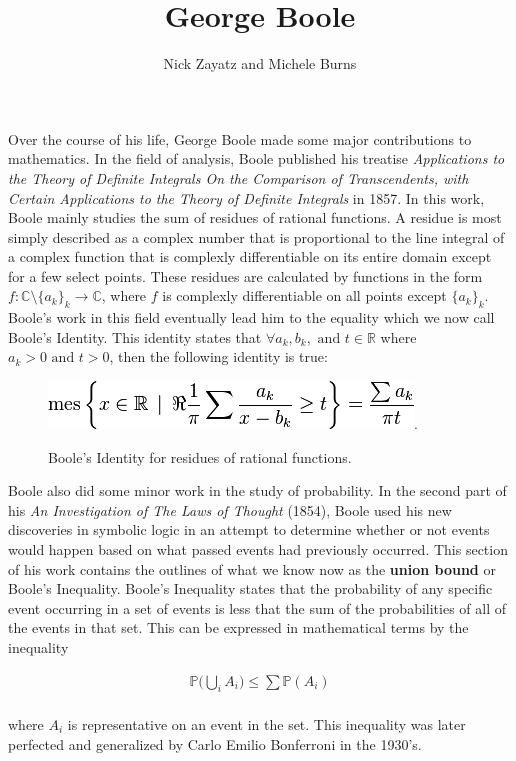 \documentclass[12]{article} %
\title{George Boole}
\author{Nick Zayatz and Michele Burns}
\begin{document}
\maketitle %

Over the course of his life, George Boole made some major contributions to mathematics. In the field of analysis, Boole published his treatise \textit{Applications to the Theory of Definite Integrals On the Comparison of Transcendents, with Certain Applications to the Theory of Definite Integrals} in 1857. In this work, Boole mainly studies the sum of residues of rational functions. A residue is most simply described as a complex number that is proportional to the line integral of a complex function that is complexly differentiable on its entire domain except for a few select points. These residues are calculated by functions in the form $f: \mathbb{C}\setminus \{a_{k}\}_{k} \rightarrow \mathbb{C}$, where $f$ is complexly differentiable on all points except $\{a_{k}\}_{k}$. Boole's work in this field eventually lead him to the equality which we now call Boole's Identity. This identity states that $\forall a_{k},b_{k}, \text{ and } t \in \mathbb{R}$ where $a_{k} > 0 \text{ and } t > 0$, then the following identity is true:

\begin{figure}[H]
\centerline{\includegraphics[scale=0.8]{boolesIdentity}.}
\caption{Boole's Identity for residues of rational functions.}\label{fig1}
\end{figure}

Boole also did some minor work in the study of probability. In the second part of his \textit{An Investigation of The Laws of Thought} (1854), Boole used his new discoveries in symbolic logic in an attempt to determine whether or not events would happen based on what passed events had previously occurred. This section of his work contains the outlines of what we know now as the \textbf{union bound} or Boole's Inequality. Boole's Inequality states that the probability of any specific event occurring in a set of events is less that the sum of the probabilities of all of the events in that set. This can be expressed in mathematical terms by the inequality

\begin{eqnarray*}
\mathbb{P}\bigg(\bigcup\limits_{i} A_{i}\bigg)\leq\sum\mathbb{P}(A_{i})
\end{eqnarray*}\\
where $A_{i}$ is representative on an event in the set. This inequality was later perfected and generalized by Carlo Emilio Bonferroni in the 1930's.
\end{document}
